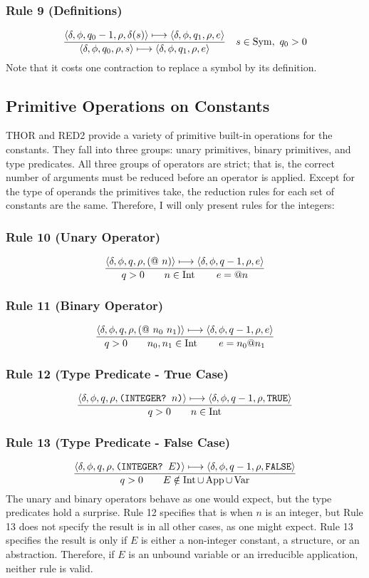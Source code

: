 \subsubsection*{Rule 9 (Definitions)}
\[
\frac{
\langle \delta,\phi,q_0-1,\rho,\delta(s)\rangle\longmapsto
\langle \delta,\phi,q_1,\rho,e\rangle
}{
\langle \delta,\phi,q_0,\rho,s\rangle\longmapsto
\langle \delta,\phi,q_1,\rho,e\rangle
}
\quad
s\in\operatorname{Sym},\ q_0>0
\]
Note that it costs one contraction to replace a symbol by its definition.

\subsection{Primitive Operations on Constants}

THOR and RED2 provide a variety of primitive built-in operations for the
constants. They fall into three groups: unary primitives, binary primitives, and
type predicates. All three groups of operators are strict; that is, the correct
number of arguments must be reduced before an operator is applied. Except for
the type of operands the primitives take, the reduction rules for each set of
constants are the same. Therefore, I will only present rules for the integers:

\subsubsection*{Rule 10 (Unary Operator)}
\[
\frac{\cfg{\delta}{\phi}{q}{\rho}{(@\ n)}\redsto
      \cfg{\delta}{\phi}{q-1}{\rho}{e}}
     {q>0\qquad n\in\Int\qquad e=@n}
\]

\subsubsection*{Rule 11 (Binary Operator)}
\[
\frac{\cfg{\delta}{\phi}{q}{\rho}{(@\ n_0\ n_1)}\redsto
      \cfg{\delta}{\phi}{q-1}{\rho}{e}}
     {q>0\qquad n_0,n_1\in\Int\qquad e=n_0@n_1}
\]

\subsubsection*{Rule 12 (Type Predicate - True Case)}
\[
\frac{\langle \delta,\phi,q,\rho,\texttt{(INTEGER? }n\texttt{)}\rangle\longmapsto
      \langle \delta,\phi,q-1,\rho,\texttt{TRUE}\rangle}
     {q>0\qquad n\in\operatorname{Int}}
\]

\subsubsection*{Rule 13 (Type Predicate - False Case)}
\[
\frac{\langle \delta,\phi,q,\rho,\texttt{(INTEGER? }E\texttt{)}\rangle\longmapsto
      \langle \delta,\phi,q-1,\rho,\texttt{FALSE}\rangle}
     {q>0\qquad E\notin \operatorname{Int}\cup\operatorname{App}\cup\operatorname{Var}}
\]
The unary and binary operators behave as one would expect, but the type
predicates hold a surprise. Rule 12 specifies that  is
 when \(n\) is an integer, but Rule 13 does not specify the result is
 in all other cases, as one might expect. Rule 13 specifies the
result is  only if \(E\) is either a non-integer constant, a
structure, or an abstraction. Therefore, if \(E\) is an unbound variable or an
irreducible application, neither rule is valid.

